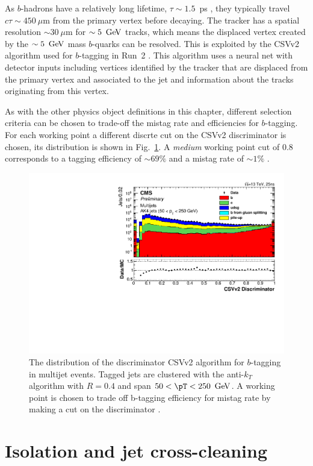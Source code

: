 As $b$-hadrons have a relatively long lifetime, $\tau\sim 1.5$~ps
\cite{PhysRevD.86.010001}, they typically travel $c\tau\sim 450~\mu$m
from the primary vertex before decaying. The \CMS tracker has a
spatial resolution $\sim 30~\mu$m for $\sim 5~\mathrm{\,Ge\kern -0.1em V}$ tracks, which
means the displaced vertex created by the $\sim 5~\mathrm{\,Ge\kern -0.1em V}$ mass $b$-quarks
can be resolved. This is exploited by the \ac{CSVv2} algorithm used
for $b$-tagging in Run~2 \cite{CMS-PAS-BTV-15-001}. This algorithm
uses a neural net with detector inputs including vertices identified
by the tracker that are displaced from the primary vertex and
associated to the jet and information about the tracks originating
from this vertex.

As with the other physics object definitions in this chapter,
different selection criteria can be chosen to trade-off the mistag
rate and efficiencies for $b$-tagging. For each working point a
different discrte cut on
the \ac{CSVv2} discriminator is chosen, its distribution is shown in
Fig.~\ref{fig:bTag}. A \emph{medium} working point cut of 0.8 corresponds to
a tagging efficiency of $\sim 69\%$ and a mistag rate of $\sim 1\%$
\cite{CMS-PAS-BTV-15-001}. 

\begin{figure}
\begin{center}
\includegraphics[width=0.7\linewidth]{figs/reconstruction/bTag} \end{center}
\caption{ The distribution of the discriminator \ac{CSVv2} algorithm
for $b$-tagging in multijet events. Tagged jets are clustered with the
anti-$k_T$ algorithm with $R=0.4$ and span $50<\pT<250~\gev$. A
working point is chosen to trade off b-tagging efficiency for mistag
rate by making a cut on the discriminator \cite{CMS-PAS-BTV-15-001}.}
\label{fig:bTag} \end{figure}

\section{Isolation and jet cross-cleaning}


